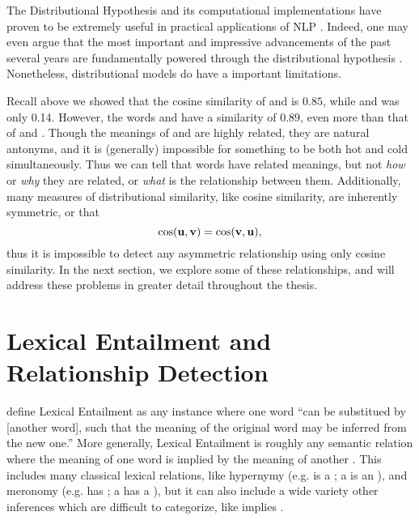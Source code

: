The Distributional Hypothesis and its computational implementations have proven
to be extremely useful in practical applications of NLP \cite{cho:2015:arxiv,goldberg:2016:jair}. Indeed,
one may even argue that the most important and impressive advancements of
the past several years are fundamentally powered through the distributional
hypothesis \cite{manning:2015:cl}. Nonetheless, distributional models do have
a important limitations.

Recall above we showed that the cosine similarity of  and
 is $0.85$, while  and  was only 0.14.
However,  the words  and  have a similarity of $0.89$, even
more than that of  and . Though the meanings of
 and  are highly related, they are natural antonyms, and it
is (generally) impossible for something to be both hot and cold simultaneously.
Thus we can tell that words have related meanings, but not {\em how} or {\em
why} they are related, or {\em what} is the relationship between them.
Additionally, many measures of distributional similarity, like cosine similarity,
are inherently symmetric, or that
\begin{equation*}
  \text{cos}({\mathbf{u}}, {\mathbf{v}}) = \text{cos}({\mathbf{v}}, {\mathbf{u}}),
\end{equation*}
thus it is impossible to detect any asymmetric relationship using only cosine
similarity. In the next section, we explore some of these relationships, and
will address these problems in greater detail throughout the thesis.

\section{Lexical Entailment and Relationship Detection}

 define Lexical Entailment as any instance
where one word ``can be substitued by [another word], such that the meaning of
the original word may be inferred from the new one.'' More generally,
Lexical Entailment is roughly any semantic relation where
the meaning of one word is implied by the meaning of another
\cite{shnarch:2008:thesis}.
This includes many classical lexical relations, like hypernymy
(e.g.  is a ; a  is an ), and meronomy
(e.g.  has ; a  has a ), but it can also include a
wide variety other inferences which are difficult to categorize,
like  implies . 

